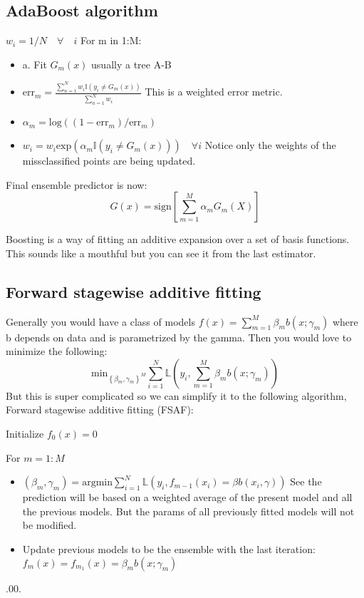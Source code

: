 \documentclass{article}
\begin{document}
\subsection*{AdaBoost algorithm}
$w_i = 1/N \quad \forall \quad i$
For m in 1:M:
\begin{itemize}
    \item a. Fit $G_m(x)$ usually a tree A-B 
    \item $\text{err}_m = \frac{\sum_{n = 1}^{N} w_i \mathbb{I}(y_i \neq G_m(x))}{\sum_{n = 1}^{N} w_i}$ 
    This is a weighted error metric.
    \item $\alpha_m  = \text{log}((1-\text{err}_m)/\text{err}_m)$
    \item $w_i = w_i \text{exp}(\alpha_m \mathbb{I}(y_i \neq G_m(x))) \quad \forall i$ Notice only the weights of the missclassified points are 
    being updated.

\end{itemize}
Final ensemble predictor is now: $$G(x) = \text{sign}[\sum_{m = 1}^{M} \alpha_m G_m (X)]$$        

Boosting is a way of fitting an additive expansion over a set of basis functions. This sounds like a mouthful but you can see it from the last estimator. 

\subsection*{Forward stagewise additive fitting}
Generally you would have a class of models $f(x) = \sum_{m = 1}^{M} \beta_m b(x;\gamma_m)$ where b depends on data and is parametrized by the gamma.
Then you would love to minimize the following:
$$\text{min}_{\left\{\beta_m, \gamma_m\right\}^M } \sum_{i = 1}^{N} \mathbb{L} (y_i, \sum_{m = 1}^{M} \beta_m b(x;\gamma_m))  $$
But this is super complicated so we can simplify it to the following algorithm, Forward stagewise additive fitting (FSAF):

Initialize $f_0(x) = 0$

For $m = 1:M$
\begin{itemize}
    \item $(\beta_m,\gamma_m) = \text{argmin}\sum_{i = 1}^{N}  \mathbb{L}(y_i, f_{m-1}(x_i) = \beta b(x_i,\gamma)) $ See the prediction will be based on a 
    weighted average of the present model and all the previous models. But the params of all previously fitted models will not be modified.
    \item Update previous models to be the ensemble with the last iteration: $f_m(x) = f_{m_1}(x) = \beta_m b(x;\gamma_m)$
\end{itemize}.00.
\end{document}
